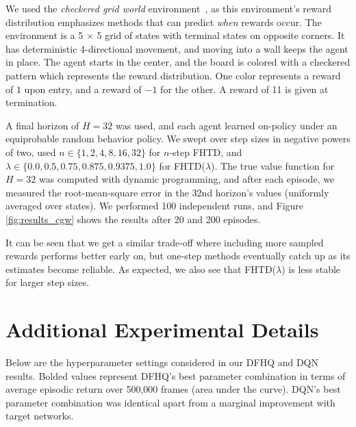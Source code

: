 \begin{appendices}
We used the \textit{checkered grid world} environment~\cite{tddft2019}, as this environment's reward distribution emphasizes methods that can predict \textit{when} rewards occur. The environment is a 5 $\times$ 5 grid of states with terminal states on opposite corners. It has deterministic 4-directional movement, and moving into a wall keeps the agent in place. The agent starts in the center, and the board is colored with a checkered pattern which represents the reward distribution. One color represents a reward of $1$ upon entry, and a reward of $-1$ for the other. A reward of 11 is given at termination.

A final horizon of $H = 32$ was used, and each agent learned on-policy under an equiprobable random behavior policy. We swept over step sizes in negative powers of two, used $n \in \{1, 2, 4, 8, 16, 32\}$ for $n$-step FHTD, and $\lambda \in \{ 0.0, 0.5, 0.75, 0.875, 0.9375, 1.0\}$ for FHTD($\lambda$). The true value function for $H = 32$ was computed with dynamic programming, and after each episode, we measured the root-mean-square error in the 32nd horizon's values (uniformly averaged over states). We performed 100 independent runs, and Figure \ref{fig:results_cgw} shows the results after 20 and 200 episodes.

It can be seen that we get a similar trade-off where including more sampled rewards performs better early on, but one-step methods eventually catch up as its estimates become reliable. As expected, we also see that FHTD($\lambda$) is less stable for larger step sizes.





\section{Additional Experimental Details}

Below are the hyperparameter settings considered in our DFHQ and DQN results. Bolded values represent DFHQ's best parameter combination in terms of average episodic return over 500,000 frames (area under the curve). DQN's best parameter combination was identical apart from a marginal improvement with target networks.


\end{appendices}

